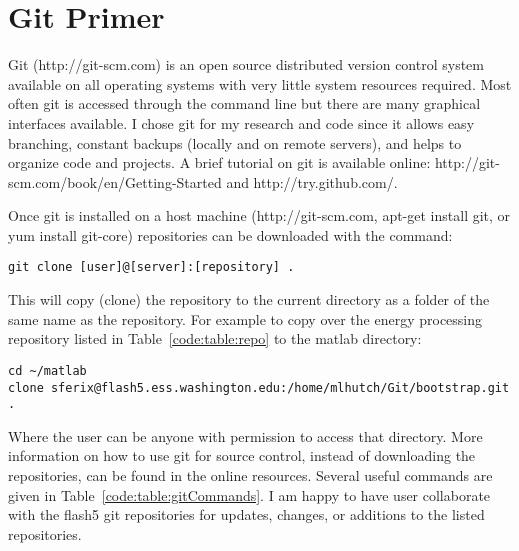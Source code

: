 \section{Git Primer}
\label{code:section:primer}

Git (http://git-scm.com) is an open source distributed version control system available on all operating systems with very little system resources required.
Most often git is accessed through the command line but there are many graphical interfaces available.
I chose git for my research and code since it allows easy branching, constant backups (locally and on remote servers), and helps to organize code and projects.
A brief tutorial on git is available online: http://git-scm.com/book/en/Getting-Started and http://try.github.com/.

Once git is installed on a host machine (http://git-scm.com, apt-get install git, or yum install git-core) repositories can be downloaded with the command:

\begin{verbatim}
git clone [user]@[server]:[repository] .
\end{verbatim}

This will copy (clone) the repository to the current directory as a folder of the same name as the repository. 
For example to copy over the energy processing repository listed in Table~\ref{code:table:repo} to the matlab directory:

\begin{verbatim}
cd ~/matlab
clone sferix@flash5.ess.washington.edu:/home/mlhutch/Git/bootstrap.git .
\end{verbatim}

Where the user can be anyone with permission to access that directory.
More information on how to use git for source control, instead of downloading the repositories, can be found in the online resources.
Several useful commands are given in Table~\ref{code:table:gitCommands}.
I am happy to have user collaborate with the flash5 git repositories for updates, changes, or additions to the listed repositories.

